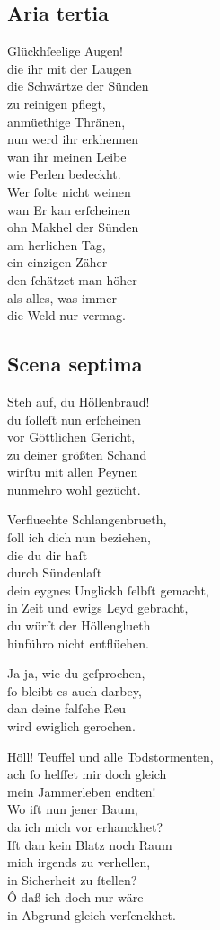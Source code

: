 \documentclass{ees}
\newenvironment{lyrics}[1]{%
  \subsection{#1}\nopagebreak%
  \begin{lyricslist}%
  \let\voice\item%
}{%
  \end{lyricslist}%
}
\begin{document}
\begin{lyrics}{Aria tertia}
  \voice[St: Magdalena]
  Glückhſeelige Augen!\\
  die ihr mit der Laugen\\
  die Schwärtze der Sünden\\
  zu reinigen pflegt,\\
  anmüethige Thränen,\\
  nun werd ihr erkhennen\\
  wan ihr meinen Leibe\\
  wie Perlen bedeckht.\\[1ex]
  Wer ſolte nicht weinen\\
  wan Er kan erſcheinen\\
  ohn Makhel der Sünden\\
  am herlichen Tag,\\
  ein einzigen Zäher\\
  den ſchätzet man höher\\
  als alles, was immer\\
  die Weld nur vermag.
\end{lyrics}

\begin{lyrics}{Scena septima}
  \voice[Lucifer]
  Steh auf, du Höllenbraud!\\
  du ſolleſt nun erſcheinen\\
  vor Göttlichen Gericht,\\
  zu deiner größten Schand\\
  wirſtu mit allen Peynen\\
  nunmehro wohl gezücht.

  \voice[Judas]
  Verfluechte Schlangenbrueth,\\
  ſoll ich dich nun beziehen,\\
  die du dir haſt\\
  durch Sündenlaſt\\
  dein eygnes Unglickh ſelbſt gemacht,\\
  in Zeit und ewigs Leyd gebracht,\\
  du würſt der Höllenglueth\\
  hinführo nicht entflüehen.

  \voice[Lucifer]
  Ja ja, wie du geſprochen,\\
  ſo bleibt es auch darbey,\\
  dan deine falſche Reu\\
  wird ewiglich gerochen.

  \voice[Judas]
  Höll! Teuffel und alle Todstormenten,\\
  ach ſo helffet mir doch gleich\\
  mein Jammerleben endten!\\
  Wo iſt nun jener Baum,\\
  da ich mich vor erhanckhet?\\
  Iſt dan kein Blatz noch Raum\\
  mich irgends zu verhellen,\\
  in Sicherheit zu ſtellen?\\
  Ô daß ich doch nur wäre\\
  in Abgrund gleich verſenckhet.
\end{lyrics}
\end{document}
